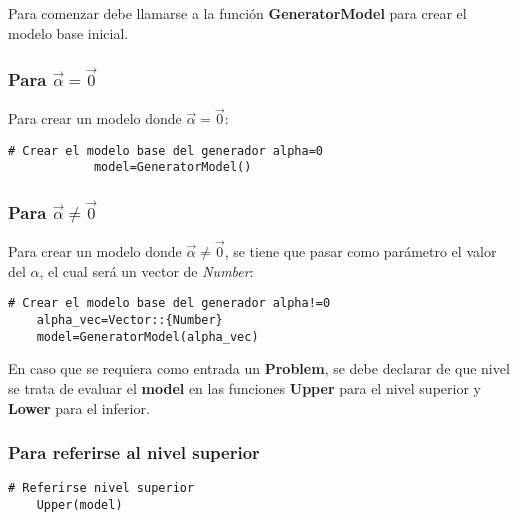 Para comenzar debe llamarse a la función \textbf{GeneratorModel} para crear el modelo base
inicial.

\subsubsection{Para $\vec{\alpha}=\vec{0}$ }

Para crear un modelo donde $\vec{\alpha}=\vec{0}$:
   
        \begin{lstlisting}[caption={Crear el modelo para $\vec{\alpha}=\vec{0}$}]
            # Crear el modelo base del generador alpha=0
            model=GeneratorModel()
        \end{lstlisting}
        
    
  
\begin{samepage}
\subsubsection{Para $\vec{\alpha} \neq \vec{0}$ }

Para crear un modelo donde $\vec{\alpha}\neq \vec{0}$,
se tiene que pasar como parámetro el valor del $\alpha$,
el cual será un vector de \textit{Number}:

\begin{lstlisting}[caption={Crear el modelo para $\vec{\alpha } \neq \vec{0}$}]
    # Crear el modelo base del generador alpha!=0
    alpha_vec=Vector::{Number}
    model=GeneratorModel(alpha_vec)
\end{lstlisting}
\end{samepage}



En caso que se requiera como entrada un \textbf{Problem}, se debe declarar
de que nivel se trata de evaluar el \textbf{model} en las funciones \textbf{Upper} para el nivel 
superior y \textbf{Lower} para el inferior.

\subsubsection{Para referirse al nivel superior}
\begin{lstlisting}[caption={Referirse al nivel superior}]
    # Referirse nivel superior
    Upper(model)
\end{lstlisting}
